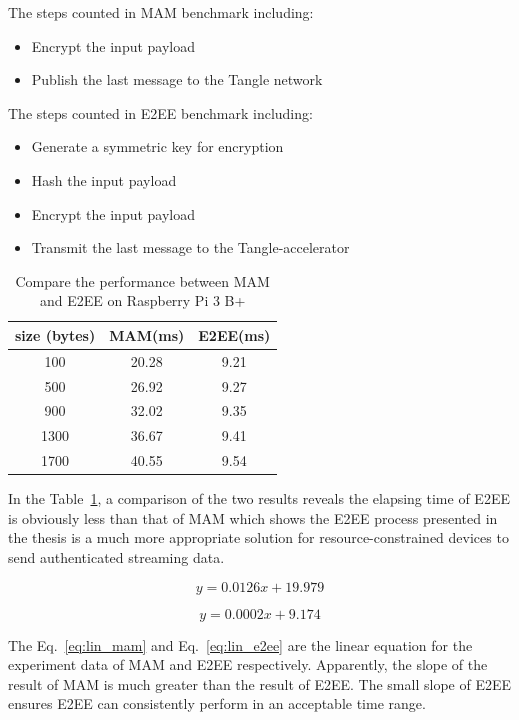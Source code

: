 \begin{spacing}{2.0}
The steps counted in MAM benchmark including:
\begin{itemize}
    \item Encrypt the input payload
    \item Publish the last message to the Tangle network
\end{itemize}

The steps counted in E2EE benchmark including:
\begin{itemize}
    \item Generate a symmetric key for encryption
    \item Hash the input payload
    \item Encrypt the input payload
    \item Transmit the last message to the Tangle-accelerator
\end{itemize}

\begin{table}[htbp]
    \caption{Compare the performance between MAM and E2EE on Raspberry Pi 3 B+}
    \label{tab:mam_vs_e2ee}
		\centering
        \begin{tabular}{|c||c|c|}
        \hline
            \textbf{size (bytes)} & \textbf{MAM(ms)} & \textbf{E2EE(ms)} \\
            \hline
            100 & 20.28 & 9.21 \\
            500 &  26.92 & 9.27 \\
            900 & 32.02 &  9.35  \\
            1300 & 36.67 & 9.41 \\
            1700 & 40.55 & 9.54 \\
            \hline
        \end{tabular}
\end{table}

In the Table~\ref{tab:mam_vs_e2ee}, a comparison of the two results reveals the elapsing time of E2EE is obviously less than that of MAM which shows the E2EE process presented in the thesis is a much more appropriate solution for resource-constrained devices to send authenticated streaming data.

\begin{equation}
\label{eq:lin_mam}
y=0.0126 x+19.979
\end{equation}

\begin{equation}
\label{eq:lin_e2ee}
y=0.0002 x+9.174
\end{equation}

The Eq.~\ref{eq:lin_mam} and Eq.~\ref{eq:lin_e2ee} are the linear equation for the experiment data of MAM and E2EE respectively. Apparently, the slope of the result of MAM is much greater than the result of E2EE. The small slope of E2EE ensures E2EE can consistently perform in an acceptable time range.


\end{spacing}
